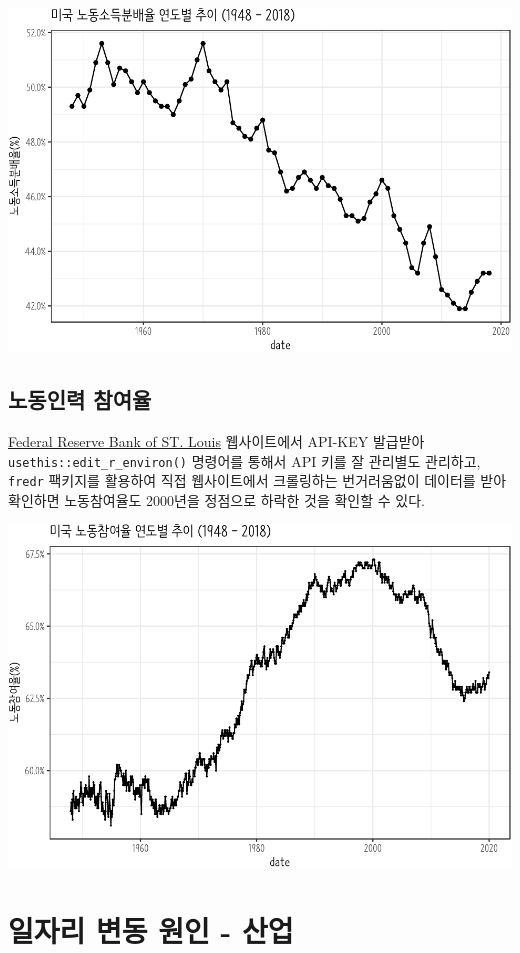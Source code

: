 \documentclass[smallextended]{svjour3}       %
\begin{document}
\begin{center}\includegraphics[width=0.77\linewidth]{paper_files/figure-latex/labor-share-us-1} \end{center}

\hypertarget{labor-participation}{%
\subsection{노동인력 참여율}\label{labor-participation}}

\href{https://research.stlouisfed.org/docs/api/api_key.html}{Federal
Reserve Bank of ST. Louis} 웹사이트에서 API-KEY 발급받아
\texttt{usethis::edit\_r\_environ()} 명령어를 통해서 API 키를 잘
관리별도 관리하고, \texttt{fredr} 팩키지를 활용하여 직접 웹사이트에서
크롤링하는 번거러움없이 데이터를 받아 확인하면 노동참여율도 2000년을
정점으로 하락한 것을 확인할 수 있다.

\begin{center}\includegraphics[width=0.77\linewidth]{paper_files/figure-latex/fred-data-labor-participation-1} \end{center}

\hypertarget{automation-job-statistics}{%
\section{일자리 변동 원인 - 산업}\label{automation-job-statistics}}
\end{document}
